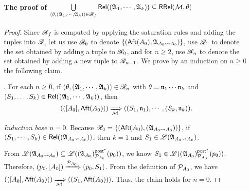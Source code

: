     \paragraph*{The proof of $\bigcup \limits_{(\theta, ({\mathfrak{A} }_1, \cdots, {\mathfrak{A} }_k)) \in \mathscr{R}_f}  \mathsf{Rel}(({\mathfrak{A} }_1, \cdots, {\mathfrak{A} }_k)) \subseteq \mathsf{RRel}({\mathcal{M} }, \theta)$}


\begin{proof}
Since $\mathscr{R}_f$ is computed by applying the saturation rules and adding the tuples into $\mathscr{R}$,  let us use $\mathscr{R}_0$ to denote $\{({\sf Aft}(A_0), {\mathfrak{A} }_{A_0\rightsquigarrow A_0})\}$, use $\mathscr{R}_1$ to denote the set obtained by adding a tuple to $\mathscr{R}_0$, and for $n \ge 2$, use $\mathscr{R}_n$ to denote the set obtained by adding a new tuple to $\mathscr{R}_{n-1}$. 
We prove by an induction on $n \ge 0$ the following claim.  

\smallskip
{}. For each $n \ge 0$, if $(\theta, ({\mathfrak{A} }_1, \cdots, {\mathfrak{A} }_k)) \in \mathscr{R}_n$ with $\theta = \mathfrak{n}_1 \cdots \mathfrak{n}_k$ and $(S_1,\dots,S_k) \in \mathsf{Rel}(({\mathfrak{A} }_1, \cdots, {\mathfrak{A} }_k))$, then $$(([A_0], {\sf Aft}(A_0))) \xRightarrow[{\mathcal{M} }]{} ((S_1, \mathfrak{n}_1), \cdots, (S_k, \mathfrak{n}_k)).$$

\smallskip



\noindent \emph{Induction base $n = 0$}. 
Because $\mathscr{R}_0 = \{({\sf Aft}(A_0),({\mathfrak{A} }_{A_0\rightsquigarrow A_0}))\}$, if $(S_1, \cdots, S_k) \in \mathsf{Rel}(({\mathfrak{A} }_{A_0\rightsquigarrow A_0}))$, then $k=1$ and $S_1 \in{\mathscr{L} }({\mathfrak{A} }_{A_0\rightsquigarrow A_0})$. 

From ${\mathscr{L} }({\mathfrak{A} }_{A_0\rightsquigarrow A_0}) \subseteq {\mathscr{L} }(({\mathfrak{A} }_{A_0})^{{\mathsf{post} }^*}_{{\mathcal{P} }_{A_0}}(p_0))$, we know $S_1\in {\mathscr{L} }(({\mathfrak{A} }_{A_0})^{{\mathsf{post} }^*}_{{\mathcal{P} }_{A_0}}(p_0))$. Therefore, $(p_0,[A_0])\xRightarrow{{\mathcal{P} }_{A_0}}(p_0,S_1)$. From the definition of ${\mathcal{P} }_{A_0}$, we have $(([A_0], {\sf Aft}(A_0))) \xRightarrow[{\mathcal{M} }]{} ((S_1, {\sf Aft}(A_0)))$. Thus, the claim holds for $n = 0$. 


\end{proof}
